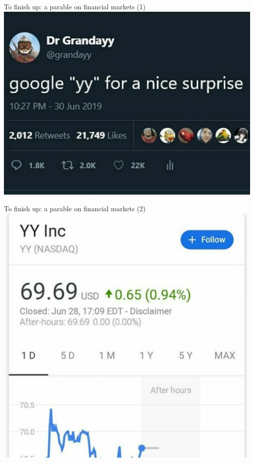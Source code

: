 \documentclass[english,10pt
,aspectratio=169
]{beamer}
\begin{document}
\begin{frame}{To finish up: a parable on financial markets (1)}
	\centering \includegraphics[width=0.6\paperwidth]{pics/yy1}
\end{frame}


\begin{frame}{To finish up: a parable on financial markets (2)}
	\centering \includegraphics[width=0.6\paperwidth]{pics/yy2}
\end{frame}
\end{document}
